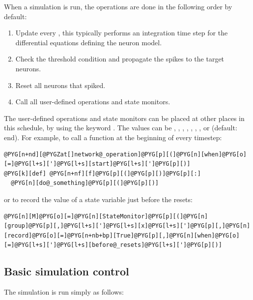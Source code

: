 \documentclass[letterpaper,10pt,english]{manual}
\begin{document}
When a simulation is run, the operations are done in the following order by default:
\begin{enumerate}
\item {} 
Update every \hyperlink{brian.NeuronGroup}{}, this typically performs an integration time step for the differential equations defining the neuron model.

\item {} 
Check the threshold condition and propagate the spikes to the target neurons.

\item {} 
Reset all neurons that spiked.

\item {} 
Call all user-defined operations and state monitors.

\end{enumerate}

The user-defined operations and state monitors can be placed at other places in this schedule, by
using the keyword . The values can be , , ,
, , , ,  or
 (default: end). For example, to call a function  at the beginning of every timestep:

\begin{Verbatim}[commandchars=@\[\]]
@PYG[n+nd][@PYGZat[]network@_operation]@PYG[p][(]@PYG[n][when]@PYG[o][=]@PYG[l+s][']@PYG[l+s][start]@PYG[l+s][']@PYG[p][)]
@PYG[k][def] @PYG[n+nf][f]@PYG[p][(]@PYG[p][)]@PYG[p][:]
  @PYG[n][do@_something]@PYG[p][(]@PYG[p][)]
\end{Verbatim}

or to record the value of a state variable just before the resets:

\begin{Verbatim}[commandchars=@\[\]]
@PYG[n][M]@PYG[o][=]@PYG[n][StateMonitor]@PYG[p][(]@PYG[n][group]@PYG[p][,]@PYG[l+s][']@PYG[l+s][x]@PYG[l+s][']@PYG[p][,]@PYG[n][record]@PYG[o][=]@PYG[n+nb+bp][True]@PYG[p][,]@PYG[n][when]@PYG[o][=]@PYG[l+s][']@PYG[l+s][before@_resets]@PYG[l+s][']@PYG[p][)]
\end{Verbatim}


\subsection{Basic simulation control}

The simulation is run simply as follows:
\end{document}
